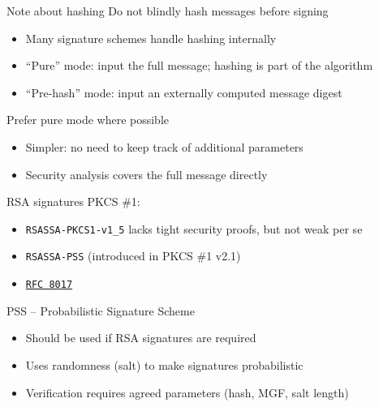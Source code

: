 \begin{frame}{Note about hashing}
  Do not blindly hash messages before signing
  \begin{itemize}[<+(1)->]
    \item Many signature schemes handle hashing internally
    \item \enquote{Pure} mode: input the full message; hashing is part of the algorithm
    \item \enquote{Pre-hash} mode: input an externally computed message digest
  \end{itemize}

  \vspace*{1em}

  \pause
  Prefer pure mode where possible
  \begin{itemize}[<+(1)->]
    \item Simpler: no need to keep track of additional parameters
    \item Security analysis covers the full message directly
  \end{itemize}
\end{frame}

\begin{frame}{RSA signatures}
  \pause
  PKCS \#1:
  \begin{itemize}[<+(1)->]
    \item \texttt{RSASSA-PKCS1-v1\_5} lacks tight security proofs, but not weak per se
    \item \texttt{RSASSA-PSS} (introduced in PKCS \#1 v2.1)
    \item \href{https://datatracker.ietf.org/doc/html/rfc8017}{\texttt{RFC 8017}}
  \end{itemize}

  \vfill

  \pause
  PSS -- Probabilistic Signature Scheme
  \begin{itemize}[<+(1)->]
    \item Should be used if RSA signatures are required
    \item Uses randomness (salt) to make signatures probabilistic
    \item Verification requires agreed parameters (hash, MGF, salt length)
  \end{itemize}
\end{frame}

